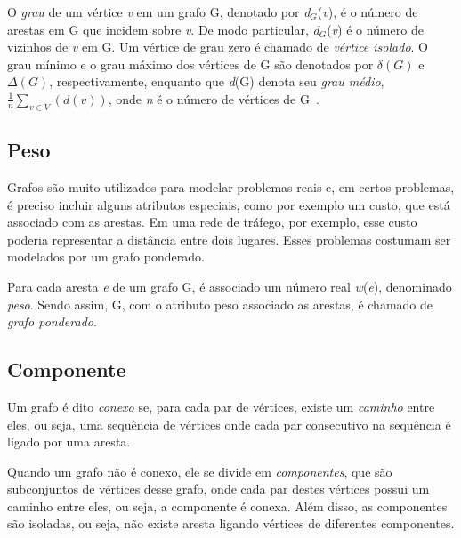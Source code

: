 \def \variable {\emph{v}}

O \emph{grau} de um vértice \emph{v} em um grafo G, denotado por \emph{d$_{G}$}(\emph{v}), é o número de arestas em G que incidem sobre \emph{v}. De modo particular, \emph{d$_{G}$}(\emph{v}) é o número de vizinhos de \emph{v} em G. Um vértice de grau zero é chamado de \emph{vértice isolado}. O grau mínimo e o grau máximo dos vértices de G são denotados por $\delta(G)$ e $\Delta(G)$, respectivamente, enquanto que \emph{d}(G) denota seu \emph{grau médio}, $\frac{1}{n}\sum_{v\in V}(d(v))$, onde \emph{n} é o número de vértices de G~\cite{bondy1976graph}.


\subsection{Peso}
\label{conceitos__grafo--peso}

Grafos são muito utilizados para modelar problemas reais e, em certos problemas, é preciso incluir alguns atributos especiais, como por exemplo um custo, que está associado com as arestas. Em uma rede de tráfego, por exemplo, esse custo poderia representar a distância entre dois lugares. Esses problemas costumam ser modelados por um grafo ponderado.

Para cada aresta \emph{e} de um grafo G, é associado um número real \emph{w}(\emph{e}), denominado \emph{peso}. Sendo assim, G, com o atributo peso associado as arestas, é chamado de \emph{grafo ponderado}.


\subsection{Componente}
\label{conceitos__grafo--componente}

Um grafo é dito \emph{conexo} se, para cada par de vértices, existe um \emph{caminho} entre eles, ou seja, uma sequência de vértices onde cada par consecutivo na sequência é ligado por uma aresta.

Quando um grafo não é conexo, ele se divide em \emph{componentes}, que são subconjuntos de vértices desse grafo, onde cada par destes vértices possui um caminho entre eles, ou seja, a componente é conexa. Além disso, as componentes são isoladas, ou seja, não existe aresta ligando vértices de diferentes componentes.


